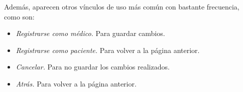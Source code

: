 		Además, aparecen otros vínculos de uso más común con bastante frecuencia, como son:
		\begin{itemize}
			\item \textit{Registrarse como médico.} Para guardar cambios.
			\item \textit{Registrarse como paciente.} Para volver a la página anterior.
			\item \textit{Cancelar.} Para no guardar los cambios realizados.
			\item \textit{Atrás.} Para volver a la página anterior.
		\end{itemize}	
		
		

	
	
	
	

